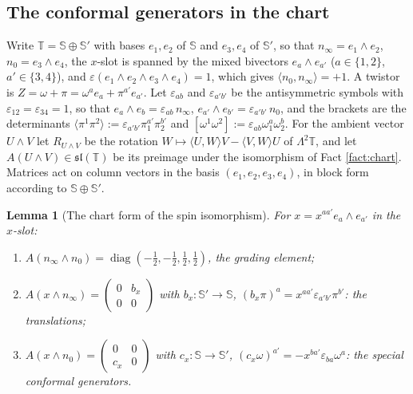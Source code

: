 \documentclass[11pt]{article}
\newtheorem{lemma}[theorem]{Lemma}
\theoremstyle{definition}
\newcommand{\T}{\mathbb{T}}
\newcommand{\ip}[2]{\langle #1, #2\rangle}
\newcommand{\br}[1]{\langle #1\rangle}
\newcommand{\Sc}{\mathbb{S}}
\begin{document}
\subsection{The conformal generators in the chart}

Write $\T = \Sc \oplus \Sc'$ with bases $e_{1}, e_{2}$ of $\Sc$ and $e_{3}, e_{4}$ of $\Sc'$, so that $n_{\infty} = e_{1}\wedge e_{2}$, $n_{0} = e_{3}\wedge e_{4}$, the $x$-slot is spanned by the mixed bivectors $e_{a}\wedge e_{a'}$ ($a \in \{1,2\}$, $a' \in \{3,4\}$), and $\varepsilon(e_{1}\wedge e_{2}\wedge e_{3}\wedge e_{4}) = 1$, which gives $\ip{n_{0}}{n_{\infty}} = +1$. A twistor is $Z = \omega + \pi = \omega^{a}e_{a} + \pi^{a'}e_{a'}$. Let $\varepsilon_{ab}$ and $\varepsilon_{a'b'}$ be the antisymmetric symbols with $\varepsilon_{12} = \varepsilon_{34} = 1$, so that $e_{a}\wedge e_{b} = \varepsilon_{ab}\,n_{\infty}$, $e_{a'}\wedge e_{b'} = \varepsilon_{a'b'}\,n_{0}$, and the brackets are the determinants $\br{\pi^{1}\pi^{2}} := \varepsilon_{a'b'}\pi_{1}^{a'}\pi_{2}^{b'}$ and $[\omega^{1}\omega^{2}] := \varepsilon_{ab}\omega_{1}^{a}\omega_{2}^{b}$. For the ambient vector $U \wedge V$ let $R_{U\wedge V}$ be the rotation $W \mapsto \ip{U}{W}V - \ip{V}{W}U$ of $\Lambda^{2}\T$, and let $A(U \wedge V) \in \mathfrak{sl}(\T)$ be its preimage under the isomorphism of Fact \ref{fact:chart}. Matrices act on column vectors in the basis $(e_{1}, e_{2}, e_{3}, e_{4})$, in block form according to $\Sc \oplus \Sc'$.

\begin{lemma}[The chart form of the spin isomorphism]\label{lem:chartiso}
For $x = x^{aa'}e_{a}\wedge e_{a'}$ in the $x$-slot:
\begin{enumerate}
\item $A(n_{\infty}\wedge n_{0}) = \operatorname{diag}(-\tfrac12, -\tfrac12, \tfrac12, \tfrac12)$, the grading element;
\item $A(x \wedge n_{\infty}) = \begin{pmatrix} 0 & b_{x} \\ 0 & 0 \end{pmatrix}$ with $b_{x}: \Sc' \to \Sc$, $(b_{x}\pi)^{a} = x^{aa'}\varepsilon_{a'b'}\pi^{b'}$: the translations;
\item $A(x \wedge n_{0}) = \begin{pmatrix} 0 & 0 \\ c_{x} & 0 \end{pmatrix}$ with $c_{x}: \Sc \to \Sc'$, $(c_{x}\omega)^{a'} = -x^{ba'}\varepsilon_{ba}\omega^{a}$: the special conformal generators.
\end{enumerate}
\end{lemma}
\end{document}
